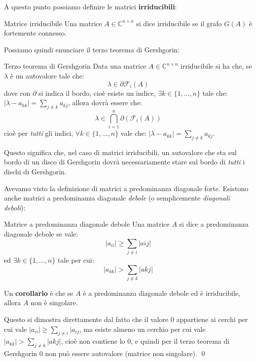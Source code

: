 \documentclass[a4paper,11pt]{article}
\begin{document}
A questo punto possiamo definire le matrici \textbf{irriducibili}:
\begin{definition}{Matrice irriducibile}
	Una matrice $A \in \mathbb{C}^{n \times n}$ si dice irriducibile se il grafo $G(A)$ è fortemente connesso.
\end{definition}

Possiamo quindi enunciare il terzo teorema di Gershgorin:
\begin{theorem}{Terzo teorema di Gershgorin}
	Data una matrice $A \in \mathbb{C}^{n \times n}$ irriducibile si ha che, se $\lambda$ è un autovalore tale che:
	$$
		\lambda \in \partial  \mathcal{F}_i(A) 
	$$
	dove con $\partial$ si indica il bordo, cioè esiste un indice, $\exists k \in \{ 1, ..., n \}$ tale che:
	$
	|\lambda - a_{kk}| = \sum_{j \neq k} a_{kj}
	$,
	allora dovrà essere che:
	$$
		\lambda \in \bigcap_{i = 1}^n \partial \left( \mathcal{F}_i(A) \right)
	$$
	cioè per \textit{tutti} gli indici, $\forall k \in \{ 1, ..., n \}$ vale che:
	$
	|\lambda - a_{kk}| = \sum_{j \neq k} a_{kj}
	$.

\end{theorem}

Questo significa che, nel caso di matrici irriducibili, un autovalore che sta sul bordo di un disco di Gershgorin dovrà necessariamente stare sul bordo di \textit{tutti} i dischi di Gershgorin.

Avevamo visto la definizione di matrici a predominanza diagonale forte.
Esistono anche matrici a predominanza diagonale \textit{debole} (o semplicemente \textit{diagonali deboli}):
\begin{definition}{Matrice a predominanza diagonale debole}
	Una matrice $A$ si dice a predominanza diagonale debole se vale:
	$$
	|a_{ii}| \geq \sum_{j \neq i} |a{ij}|
	$$
	ed $\exists k \in \{ 1, ..., n \}$ tale per cui:
	$$
	|a_{kk}| > \sum_{j \neq k} |a{kj}|
	$$
\end{definition}

Un \textbf{corollario} è che se $A$ è a predominanza diagonale debole ed è irriducibile, allora $A$ non è singolare.

Questo si dimostra direttamente dal fatto che il valore $0$ appartiene ai cerchi per cui vale $|a_{ii}| \geq \sum_{j \neq i} |a_{ij}$, ma esiste almeno un cerchio per cui vale $|a_{kk}| > \sum_{j \neq k} |a{kj}|$, cioè non contiene lo $0$, e quindi per il terzo teorema di Gershgorin $0$ non può essere autovalore (matrice non singolare). \qed
\end{document}
